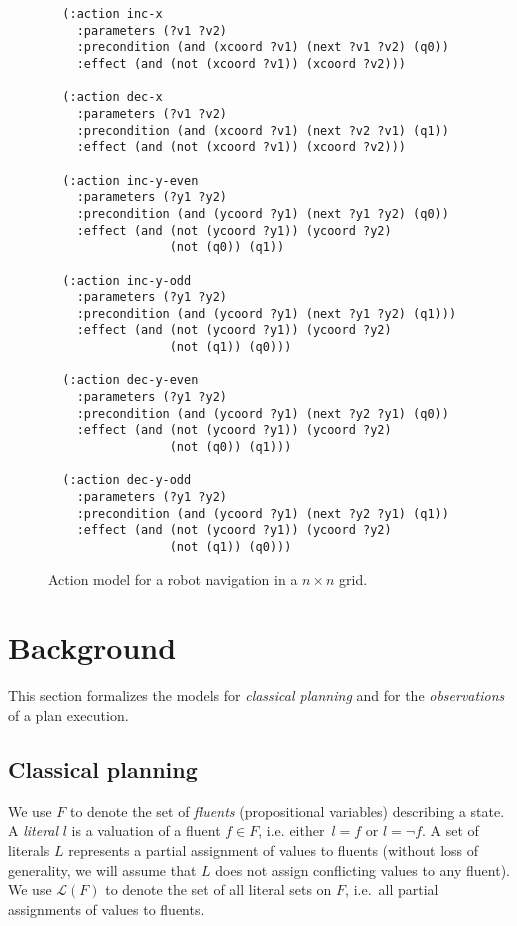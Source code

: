 \documentclass[letterpaper]{article} %
\begin{document}
\begin{figure}
  \begin{tiny}
  \begin{verbatim}
  (:action inc-x
    :parameters (?v1 ?v2)
    :precondition (and (xcoord ?v1) (next ?v1 ?v2) (q0))
    :effect (and (not (xcoord ?v1)) (xcoord ?v2)))

  (:action dec-x
    :parameters (?v1 ?v2)
    :precondition (and (xcoord ?v1) (next ?v2 ?v1) (q1))
    :effect (and (not (xcoord ?v1)) (xcoord ?v2)))

  (:action inc-y-even
    :parameters (?y1 ?y2)
    :precondition (and (ycoord ?y1) (next ?y1 ?y2) (q0))
    :effect (and (not (ycoord ?y1)) (ycoord ?y2)
                 (not (q0)) (q1))

  (:action inc-y-odd
    :parameters (?y1 ?y2)
    :precondition (and (ycoord ?y1) (next ?y1 ?y2) (q1)))
    :effect (and (not (ycoord ?y1)) (ycoord ?y2)
                 (not (q1)) (q0)))

  (:action dec-y-even
    :parameters (?y1 ?y2)
    :precondition (and (ycoord ?y1) (next ?y2 ?y1) (q0))
    :effect (and (not (ycoord ?y1)) (ycoord ?y2)
                 (not (q0)) (q1)))

  (:action dec-y-odd
    :parameters (?y1 ?y2)
    :precondition (and (ycoord ?y1) (next ?y2 ?y1) (q1))
    :effect (and (not (ycoord ?y1)) (ycoord ?y2)
                 (not (q1)) (q0)))
  \end{verbatim}           
  \end{tiny}  
 \caption{\small Action model for a robot navigation in a $n\times n$ grid.}
\label{fig:model-example}
\end{figure}



\section{Background}
\label{sec:background}
This section formalizes the models for {\em classical planning} and for the {\em observations} of a plan execution.

\subsection{Classical planning}
We use $F$ to denote the set of {\em fluents} (propositional variables) describing a state. A {\em literal} $l$ is a valuation of a fluent $f\in F$, i.e. either~$l=f$ or $l=\neg f$. A set of literals $L$ represents a partial assignment of values to fluents (without loss of generality, we will assume that $L$ does not assign conflicting values to any fluent). We use $\mathcal{L}(F)$ to denote the set of all literal sets on $F$, i.e.~all partial assignments of values to fluents.
\end{document}

